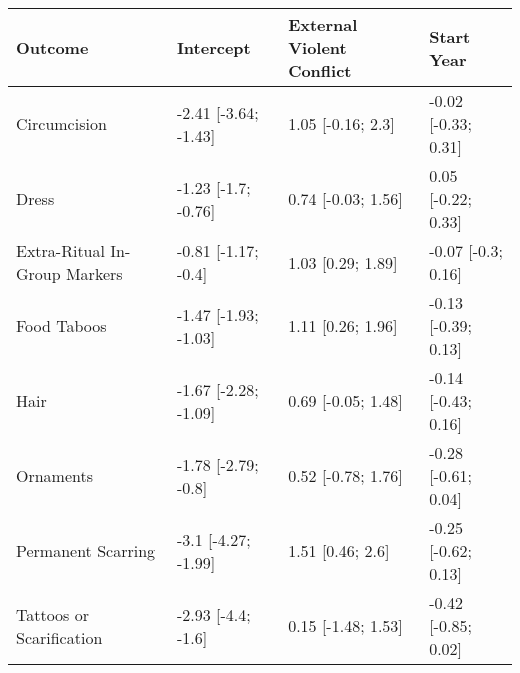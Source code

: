 \begin{tabular}{llll}
\toprule
Outcome & Intercept & External Violent Conflict & Start Year \\
\midrule
Circumcision & -2.41 [-3.64; -1.43] & 1.05 [-0.16; 2.3] & -0.02 [-0.33; 0.31] \\
Dress & -1.23 [-1.7; -0.76] & 0.74 [-0.03; 1.56] & 0.05 [-0.22; 0.33] \\
Extra-Ritual In-Group Markers & -0.81 [-1.17; -0.4] & 1.03 [0.29; 1.89] & -0.07 [-0.3; 0.16] \\
Food Taboos & -1.47 [-1.93; -1.03] & 1.11 [0.26; 1.96] & -0.13 [-0.39; 0.13] \\
Hair & -1.67 [-2.28; -1.09] & 0.69 [-0.05; 1.48] & -0.14 [-0.43; 0.16] \\
Ornaments & -1.78 [-2.79; -0.8] & 0.52 [-0.78; 1.76] & -0.28 [-0.61; 0.04] \\
Permanent Scarring & -3.1 [-4.27; -1.99] & 1.51 [0.46; 2.6] & -0.25 [-0.62; 0.13] \\
Tattoos or Scarification & -2.93 [-4.4; -1.6] & 0.15 [-1.48; 1.53] & -0.42 [-0.85; 0.02] \\
\bottomrule
\end{tabular}
